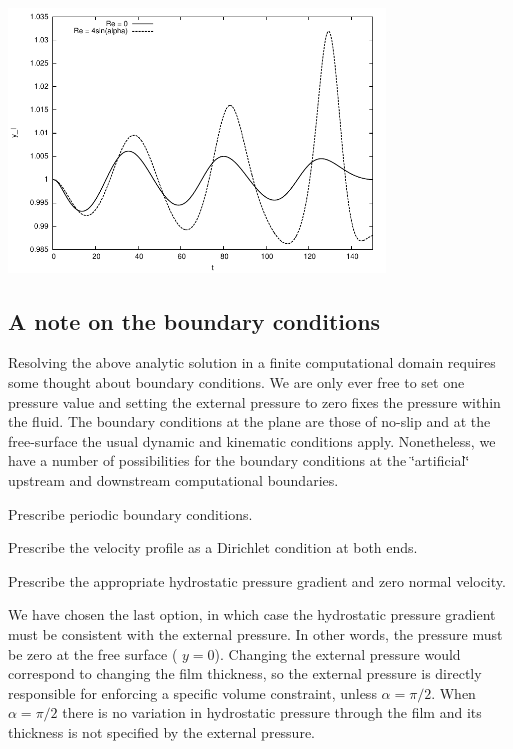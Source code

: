  
\begin{DoxyImage}
\includegraphics[width=0.75\textwidth]{time_trace}
\end{DoxyImage}
\hypertarget{index_bound}{}\subsection{A note on the boundary conditions}\label{index_bound}
Resolving the above analytic solution in a finite computational domain requires some thought about boundary conditions. We are only ever free to set one pressure value and setting the external pressure to zero fixes the pressure within the fluid. The boundary conditions at the plane are those of no-\/slip and at the free-\/surface the usual dynamic and kinematic conditions apply. Nonetheless, we have a number of possibilities for the boundary conditions at the \char`\"{}artificial\char`\"{} upstream and downstream computational boundaries.
\begin{DoxyItemize}
\item Prescribe periodic boundary conditions.
\item Prescribe the velocity profile as a Dirichlet condition at both ends.
\item Prescribe the appropriate hydrostatic pressure gradient and zero normal velocity.
\end{DoxyItemize}

We have chosen the last option, in which case the hydrostatic pressure gradient must be consistent with the external pressure. In other words, the pressure must be zero at the free surface ( $y=0$). Changing the external pressure would correspond to changing the film thickness, so the external pressure is directly responsible for enforcing a specific volume constraint, unless $\alpha = \pi/2$. When $\alpha = \pi/2$ there is no variation in hydrostatic pressure through the film and its thickness is not specified by the external pressure.

